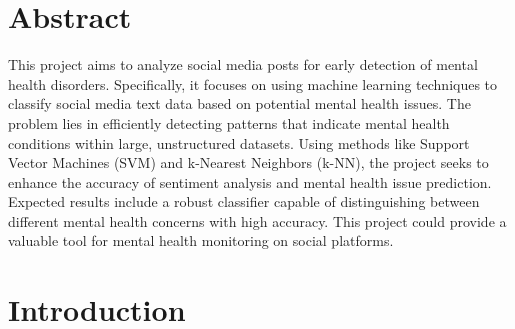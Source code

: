 



\section*{Abstract} 




\noindent
This project aims to analyze social media posts for early detection of mental health disorders. Specifically, it focuses on using machine learning techniques to classify social media text data based on potential mental health issues. The problem lies in efficiently detecting patterns that indicate mental health conditions within large, unstructured datasets. Using methods like Support Vector Machines (SVM) and k-Nearest Neighbors (k-NN), the project seeks to enhance the accuracy of sentiment analysis and mental health issue prediction. Expected results include a robust classifier capable of distinguishing between different mental health concerns with high accuracy. This project could provide a valuable tool for mental health monitoring on social platforms.




\section{Introduction}

